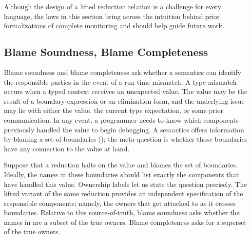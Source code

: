 \documentclass[ twoside,open=right,titlepage,numbers=noenddot,headinclude,%
                footinclude=true,cleardoublepage=empty,abstract=off,
                BCOR=5mm,paper=a4,fontsize=11pt,%
                ngerman,american,%
                parts,pdfspacing]{scrreprt}
\newcommand{\Ssubsubsection}[2]{\subsubsection[#1]{#2}}
\renewcommand{\Ssubsubsection}[2]{\subsection[#1]{#2}}
\begin{document}


Although the design of a lifted reduction relation is a challenge
 for every language,
 the laws in this section bring across the intuition behind prior
 formalizations of complete monitoring
 and should help guide future work.

\Ssubsubsection{Blame Soundness, Blame Completeness}{Blame Soundness, Blame Completeness}\label{t:x28part_x22secx3adesignx3aownershipx22x29}

Blame soundness and blame completeness
 ask whether a semantics can identify the responsible parties
 in the event of a run{-}time mismatch.
A type mismatch occurs when a typed context receives an unexpected value.
The value may be the result of a boundary expression or an elimination form,
 and the underlying issue may lie with either the value,
 the current type expectation, or some prior communication.
In any event, a programmer needs to know which components previously handled
 the value to begin debugging.
A semantics offers information by blaming a set of boundaries (\relax{$\sbset$});
 the meta{-}question is whether those boundaries have any connection to the
 value at hand.

Suppose that a reduction halts on the value  and blames
 the set  of boundaries.
Ideally, the names in these boundaries should list exactly the components that
 have handled this value.
Ownership labels let us state the question precisely.
The lifted variant of the same reduction provides an independent specification
 of the responsible components; namely, the owners that get attached to
  as it crosses boundaries.
Relative to this source{-}of{-}truth, blame soundness asks whether the
 names in  are a subset of the true owners.
Blame completeness asks for a superset of the true owners.
\end{document}
